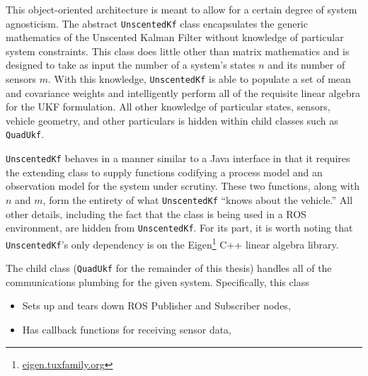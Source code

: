 This object-oriented architecture is meant to allow for a certain degree of system agnosticism. The abstract \texttt{UnscentedKf} class encapsulates the generic mathematics of the Unscented Kalman Filter without knowledge of particular system constraints. This class does little other than matrix mathematics and is designed to take as input the number of a system's states $n$ and its number of sensors $m$. With this knowledge, \texttt{UnscentedKf} is able to populate a set of mean and covariance weights and intelligently perform all of the requisite linear algebra for the UKF formulation. All other knowledge of particular states, sensors, vehicle geometry, and other particulars is hidden within child classes such as \texttt{QuadUkf}.

\texttt{UnscentedKf} behaves in a manner similar to a Java interface in that it requires the extending class to supply functions codifying a process model and an observation model for the system under scrutiny. These two functions, along with $n$ and $m$, form the entirety of what \texttt{UnscentedKf} ``knows about the vehicle.'' All other details, including the fact that the class is being used in a ROS environment, are hidden from \texttt{UnscentedKf}. For its part, it is worth noting that \texttt{UnscentedKf}'s only dependency is on the Eigen\footnote{\url{eigen.tuxfamily.org}} C++ linear algebra library.

The child class (\texttt{QuadUkf} for the remainder of this thesis) handles all of the communications plumbing for the given system. Specifically, this class

\begin{itemize}
\item Sets up and tears down ROS Publisher and Subscriber nodes,
\item Has callback functions for receiving sensor data,

\end{itemize}